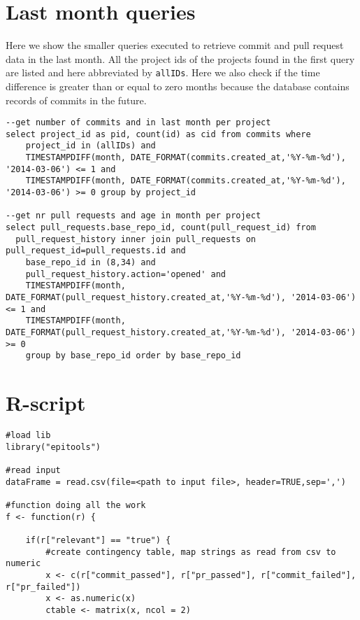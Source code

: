 \begin{appendices}
\section{Last month queries} \label{app:lastMonth}
Here we show the smaller queries executed to retrieve commit and pull request data in the last month. All the project ids of the projects found in the first query are listed and here abbreviated by \texttt{allIDs}. Here we also check if the time difference is greater than or equal to zero months because the database contains records of commits in the future.
\begin{scriptsize}
\begin{verbatim}
--get number of commits and in last month per project
select project_id as pid, count(id) as cid from commits where 
    project_id in (allIDs) and 
    TIMESTAMPDIFF(month, DATE_FORMAT(commits.created_at,'%Y-%m-%d'), '2014-03-06') <= 1 and 
    TIMESTAMPDIFF(month, DATE_FORMAT(commits.created_at,'%Y-%m-%d'), '2014-03-06') >= 0 group by project_id

--get nr pull requests and age in month per project 
select pull_requests.base_repo_id, count(pull_request_id) from 
  pull_request_history inner join pull_requests on pull_request_id=pull_requests.id and 
    base_repo_id in (8,34) and 
    pull_request_history.action='opened' and 
    TIMESTAMPDIFF(month, DATE_FORMAT(pull_request_history.created_at,'%Y-%m-%d'), '2014-03-06') <= 1 and 
    TIMESTAMPDIFF(month, DATE_FORMAT(pull_request_history.created_at,'%Y-%m-%d'), '2014-03-06') >= 0 
    group by base_repo_id order by base_repo_id
\end{verbatim}
\end{scriptsize}

\section{R-script}\label{app:R-script}
\begin{scriptsize}
\begin{verbatim}
#load lib
library("epitools")

#read input
dataFrame = read.csv(file=<path to input file>, header=TRUE,sep=',')

#function doing all the work
f <- function(r) {
    
    if(r["relevant"] == "true") {    
        #create contingency table, map strings as read from csv to numeric
        x <- c(r["commit_passed"], r["pr_passed"], r["commit_failed"], r["pr_failed"])
        x <- as.numeric(x)
        ctable <- matrix(x, ncol = 2)
        

\end{verbatim}
\end{scriptsize}
\end{appendices}
